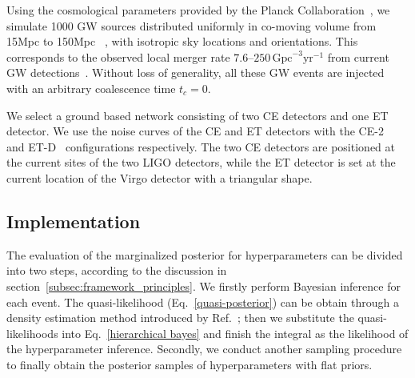 \documentclass[a4paper,11pt]{article}
\begin{document}
Using the cosmological parameters provided by the Planck Collaboration~\cite{Planck:2018vyg}, 
we simulate 1000 GW sources distributed uniformly in co-moving volume from 15Mpc to 150Mpc
~\cite{Fishbach:2018edt,KAGRA:2021duu}, with isotropic sky locations and orientations. 
This corresponds to the observed local merger rate $7.6$--$250\,\mathrm{Gpc}^{-3}\mathrm{yr}^{-1}$ from current GW 
detections~\cite{LIGOScientific:2025pvj,LIGOScientific:2020aai}. Without loss of generality, all 
these GW events are injected with an arbitrary coalescence time $t_c=0$.

We select a ground based network consisting of two CE detectors and one ET 
detector. We use the noise curves of the CE and ET detectors with the CE-2~\cite{Reitze:2019iox,Reitze:2019dyk} 
and ET-D~\cite{Punturo:2010zz,Hild:2010id,Sathyaprakash:2012jk} configurations respectively. 
The two CE detectors are positioned at the current sites of the two LIGO detectors, 
while the ET detector is set at the current location of the Virgo detector with a triangular shape. 

\subsection{Implementation}
\label{subsec:simulation_implementation}

The evaluation of the marginalized posterior for hyperparameters can be divided 
into two steps, according to the discussion in section~\ref{subsec:framework_principles}. 
We firstly perform Bayesian inference for each event. The quasi-likelihood (Eq.~\eqref{quasi-posterior}) 
can be obtain through a density estimation method introduced by Ref.~\cite{Talbot:2020oeu}; 
then we substitute the quasi-likelihoods into Eq.~\eqref{hierarchical bayes} and 
finish the integral as the likelihood of the hyperparameter inference. Secondly, 
we conduct another sampling procedure to finally obtain the posterior samples of 
hyperparameters with flat priors. 
\end{document}
